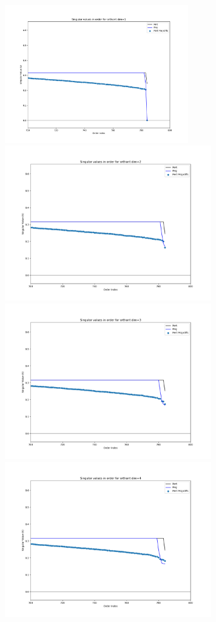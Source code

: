 \includegraphics[width=8cm]{c4_figures/e03-SVD-Orthant_origin-dim-cropped1.png}
\includegraphics[width=9cm]{c4_figures/e03-SVD-Orthant_origin-dim-cropped2.png}
\includegraphics[width=9cm]{c4_figures/e03-SVD-Orthant_origin-dim-cropped3.png}
\includegraphics[width=9cm]{c4_figures/e03-SVD-Orthant_origin-dim-cropped4.png}
